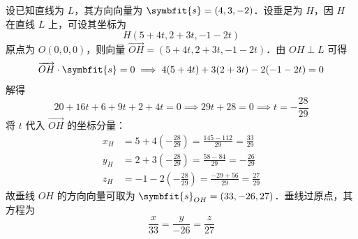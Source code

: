 \begin{solution}
    设已知直线为 $L$，其方向向量为 $\symbfit{s} = (4, 3, -2)$．设垂足为 $H$，因 $H$ 在直线 $L$ 上，可设其坐标为
    \begin{equation}
        H(5 + 4t, 2 + 3t, -1 - 2t)
    \end{equation}
    原点为 $O(0, 0, 0)$，则向量 $\overrightarrow{OH} = (5 + 4t, 2 + 3t, -1 - 2t)$．由 $OH \perp L$ 可得
    \begin{equation}
        \overrightarrow{OH} \cdot \symbfit{s} = 0 \implies 4(5 + 4t) + 3(2 + 3t) - 2(-1 - 2t) = 0
    \end{equation}
    解得
    \begin{equation}
        20 + 16t + 6 + 9t + 2 + 4t = 0 \implies 29t + 28 = 0 \implies t = -\frac{28}{29}
    \end{equation}
    将 $t$ 代入 $\overrightarrow{OH}$ 的坐标分量：
    \begin{equation}
        \begin{aligned}
            x_H & = 5 + 4\left(-\frac{28}{29}\right) = \frac{145 - 112}{29} = \frac{33}{29} \\
            y_H & = 2 + 3\left(-\frac{28}{29}\right) = \frac{58 - 84}{29} = -\frac{26}{29}  \\
            z_H & = -1 - 2\left(-\frac{28}{29}\right) = \frac{-29 + 56}{29} = \frac{27}{29}
        \end{aligned}
    \end{equation}
    故垂线 $OH$ 的方向向量可取为 $\symbfit{s}_{OH} = (33, -26, 27)$．垂线过原点，其方程为
    \begin{equation}
        \boxed{\frac{x}{33} = \frac{y}{-26} = \frac{z}{27}}
    \end{equation}
\end{solution}

\endinput
